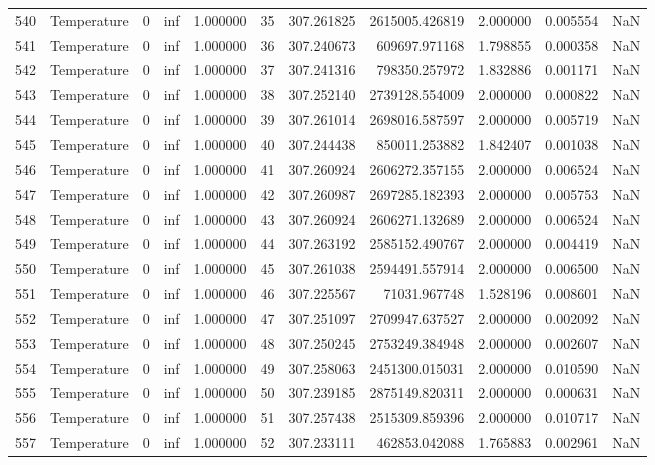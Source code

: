 \begin{tabular}{llrrrrrrrrr}
540 & Temperature & 0 & inf & 1.000000 & 35 & 307.261825 & 2615005.426819 & 2.000000 & 0.005554 & NaN \\
541 & Temperature & 0 & inf & 1.000000 & 36 & 307.240673 & 609697.971168 & 1.798855 & 0.000358 & NaN \\
542 & Temperature & 0 & inf & 1.000000 & 37 & 307.241316 & 798350.257972 & 1.832886 & 0.001171 & NaN \\
543 & Temperature & 0 & inf & 1.000000 & 38 & 307.252140 & 2739128.554009 & 2.000000 & 0.000822 & NaN \\
544 & Temperature & 0 & inf & 1.000000 & 39 & 307.261014 & 2698016.587597 & 2.000000 & 0.005719 & NaN \\
545 & Temperature & 0 & inf & 1.000000 & 40 & 307.244438 & 850011.253882 & 1.842407 & 0.001038 & NaN \\
546 & Temperature & 0 & inf & 1.000000 & 41 & 307.260924 & 2606272.357155 & 2.000000 & 0.006524 & NaN \\
547 & Temperature & 0 & inf & 1.000000 & 42 & 307.260987 & 2697285.182393 & 2.000000 & 0.005753 & NaN \\
548 & Temperature & 0 & inf & 1.000000 & 43 & 307.260924 & 2606271.132689 & 2.000000 & 0.006524 & NaN \\
549 & Temperature & 0 & inf & 1.000000 & 44 & 307.263192 & 2585152.490767 & 2.000000 & 0.004419 & NaN \\
550 & Temperature & 0 & inf & 1.000000 & 45 & 307.261038 & 2594491.557914 & 2.000000 & 0.006500 & NaN \\
551 & Temperature & 0 & inf & 1.000000 & 46 & 307.225567 & 71031.967748 & 1.528196 & 0.008601 & NaN \\
552 & Temperature & 0 & inf & 1.000000 & 47 & 307.251097 & 2709947.637527 & 2.000000 & 0.002092 & NaN \\
553 & Temperature & 0 & inf & 1.000000 & 48 & 307.250245 & 2753249.384948 & 2.000000 & 0.002607 & NaN \\
554 & Temperature & 0 & inf & 1.000000 & 49 & 307.258063 & 2451300.015031 & 2.000000 & 0.010590 & NaN \\
555 & Temperature & 0 & inf & 1.000000 & 50 & 307.239185 & 2875149.820311 & 2.000000 & 0.000631 & NaN \\
556 & Temperature & 0 & inf & 1.000000 & 51 & 307.257438 & 2515309.859396 & 2.000000 & 0.010717 & NaN \\
557 & Temperature & 0 & inf & 1.000000 & 52 & 307.233111 & 462853.042088 & 1.765883 & 0.002961 & NaN \\

\end{tabular}
